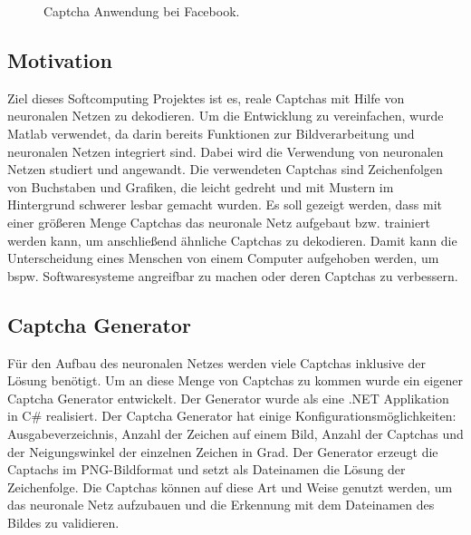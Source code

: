 \begin{figure}[htbp]
  \centering
  \caption{Captcha Anwendung bei Facebook.}
  \label{Captchas}
\end{figure}

\subsection{Motivation}
Ziel dieses Softcomputing Projektes ist es, reale Captchas mit Hilfe von neuronalen Netzen zu dekodieren. Um die Entwicklung zu vereinfachen, wurde Matlab verwendet, da darin bereits Funktionen zur Bildverarbeitung und neuronalen Netzen integriert sind. Dabei wird die Verwendung von neuronalen Netzen studiert und angewandt. Die verwendeten Captchas sind Zeichenfolgen von Buchstaben und Grafiken, die leicht gedreht und mit Mustern im Hintergrund schwerer lesbar gemacht wurden. Es soll gezeigt werden, dass mit einer größeren Menge Captchas das neuronale Netz aufgebaut bzw. trainiert werden kann, um anschließend ähnliche Captchas zu dekodieren. Damit kann die Unterscheidung eines Menschen von einem Computer aufgehoben werden, um bspw. Softwaresysteme angreifbar zu machen oder deren Captchas zu verbessern. 

\subsection{Captcha Generator}
Für den Aufbau des neuronalen Netzes werden viele Captchas inklusive der Lösung benötigt. Um an diese Menge von Captchas zu kommen wurde ein eigener Captcha Generator entwickelt. Der Generator wurde als eine .NET Applikation in C\# realisiert. Der Captcha Generator hat einige Konfigurationsmöglichkeiten: Ausgabeverzeichnis, Anzahl der Zeichen auf einem Bild, Anzahl der Captchas und der Neigungswinkel der einzelnen Zeichen in Grad. Der Generator erzeugt die Captachs im PNG-Bildformat und setzt als Dateinamen die Lösung der Zeichenfolge. Die Captchas können auf diese Art und Weise genutzt werden, um das neuronale Netz aufzubauen und die Erkennung mit dem Dateinamen des Bildes zu validieren.

